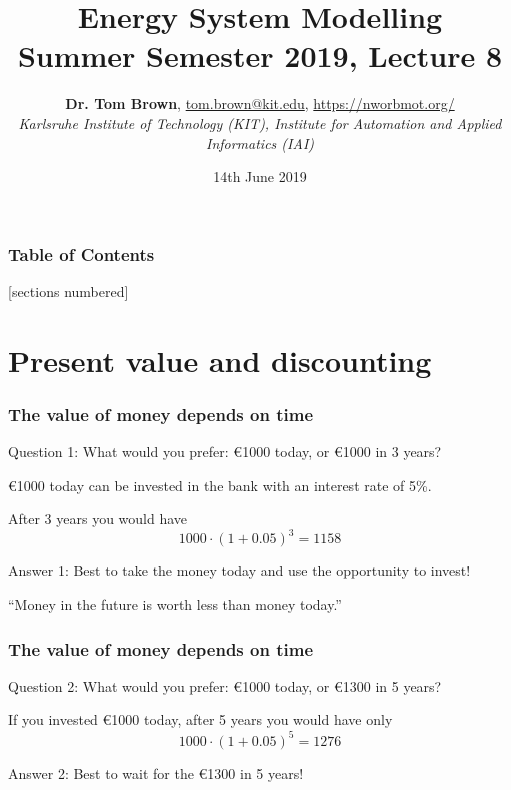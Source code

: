\documentclass[10pt,aspectratio=169,dvipsnames]{beamer}
\title{Energy System Modelling\\ Summer Semester 2019, Lecture 8}
\author{
  {\bf Dr. Tom Brown}, \href{mailto:tom.brown@kit.edu}{tom.brown@kit.edu}, \url{https://nworbmot.org/}\\
  \emph{Karlsruhe Institute of Technology (KIT), Institute for Automation and Applied Informatics (IAI)}
}
\date{\vspace{.3cm}14th June 2019}
\begin{document}
\maketitle


\begin{frame}

  \frametitle{Table of Contents}
  [sections numbered]
  \tableofcontents[hideallsubsections]
\end{frame}


\section{Present value and discounting}


\begin{frame}
  \frametitle{The value of money depends on time}


  \alert{Question 1:} What would you prefer: \euro 1000 today, or \euro 1000 in 3 years?

  \pause

  \euro 1000 today can be invested in the bank with an interest rate of 5\%.

  After 3 years you would have
  \begin{equation*}
     1000 \cdot (1 + 0.05)^3 = 1158
  \end{equation*}

  \alert{Answer 1:} Best to take the money today and use the opportunity to invest!

  \vspace{.5cm}

 ``Money in the future is worth less than money today.''

\end{frame}


\begin{frame}
  \frametitle{The value of money depends on time}


  \alert{Question 2:} What would you prefer: \euro 1000 today, or \euro 1300 in 5  years?

  \pause

  If you invested \euro 1000 today, after 5 years you would have only
  \begin{equation*}
     1000 \cdot (1 + 0.05)^5 = 1276
  \end{equation*}

  \alert{Answer 2:} Best to wait for the \euro 1300 in 5 years!


\end{frame}
\end{document}
